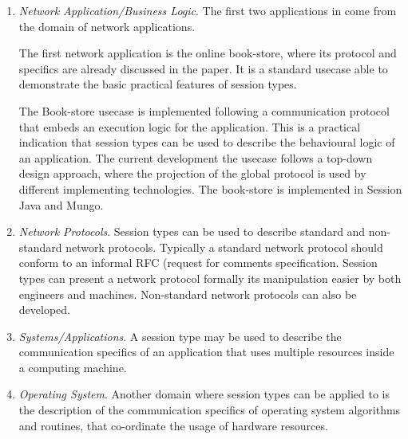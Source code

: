 \begin{enumerate}
	\item	{\em Network Application/Business Logic}.
			The first two applications in 
			come from the domain of network applications.

			The first network application is the online book-store,
			where its protocol and specifics are already discussed
			in the paper. It is a standard usecase able to demonstrate
			the basic practical features of session types.

			The Book-store usecase is implemented following a
			communication protocol that embeds an execution logic
			for the application. This is a practical indication
			that session types can be used to describe the
			behavioural logic of an application.
			The current development the usecase follows a
			top-down design approach, where the projection
			of the global protocol is used by different
			implementing technologies.
			The book-store is implemented in Session Java and Mungo.
		


	
	\item	{\em Network Protocols}.
	Session types can be used to describe standard and non-standard network protocols.
	Typically a standard network protocol should conform to
	an informal RFC (request for comments specification. Session types
	can present a network protocol formally its manipulation easier
	by both engineers and machines.
	Non-standard network protocols can also be developed.
	
	
	\item	{\em Systems/Applications}.
	A session type may be used to describe the communication
	specifics of an application that uses multiple resources
	inside a computing machine.
	
	\item	{\em Operating System}.
	Another domain where session types can be applied to
	is the description of the communication specifics
	of operating system algorithms and routines, that
	co-ordinate the usage of hardware resources.
	

\end{enumerate}
